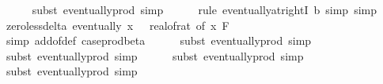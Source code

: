 \begin{isabellebody}
\ \ \ \ \isamarkupfalse%
\ {\isacharparenleft}{\kern0pt}subst\ eventually{\isacharunderscore}{\kern0pt}prod{}{\isacharprime}{\kern0pt}{\isacharcomma}{\kern0pt}\ simp{\isacharparenright}{\kern0pt}\isanewline
\ \ \ \ \isamarkupfalse%
\ {\isacharparenleft}{\kern0pt}rule\ eventually{\isacharunderscore}{\kern0pt}at{\isacharunderscore}{\kern0pt}rightI{\isacharbrackleft}{\kern0pt}\ b{\isacharequal}{\kern0pt}{\isachardoublequoteopen}{}{\isachardoublequoteclose}{\isacharbrackright}{\kern0pt}{\isacharcomma}{\kern0pt}\ simp{\isacharcomma}{\kern0pt}\ simp{\isacharparenright}{\kern0pt}\isanewline
\isanewline
\ \ \isamarkupfalse%
\ zero{\isacharunderscore}{\kern0pt}less{\isacharunderscore}{\kern0pt}delta{\isacharcolon}{\kern0pt}\ {\isachardoublequoteopen}eventually\ {\isacharparenleft}{\kern0pt}{\isasymlambda}x{\isachardot}{\kern0pt}\ {}\ {\isacharless}{\kern0pt}\ {\isacharparenleft}{\kern0pt}real{\isacharunderscore}{\kern0pt}of{\isacharunderscore}{\kern0pt}rat\ {\isacharparenleft}{\kern0pt}{\isasymdelta}{\isacharunderscore}{\kern0pt}of\ x{\isacharparenright}{\kern0pt}{\isacharparenright}{\kern0pt}{\isacharparenright}{\kern0pt}\ {\isacharquery}{\kern0pt}F{\isachardoublequoteclose}\isanewline
\ \ \ \ \isamarkupfalse%
\ {\isacharparenleft}{\kern0pt}simp\ add{\isacharcolon}{\kern0pt}{\isasymdelta}{\isacharunderscore}{\kern0pt}of{\isacharunderscore}{\kern0pt}def\ case{\isacharunderscore}{\kern0pt}prod{\isacharunderscore}{\kern0pt}beta{\isacharprime}{\kern0pt}{\isacharparenright}{\kern0pt}\isanewline
\ \ \ \ \isamarkupfalse%
\ {\isacharparenleft}{\kern0pt}subst\ eventually{\isacharunderscore}{\kern0pt}prod{}{\isacharprime}{\kern0pt}{\isacharcomma}{\kern0pt}\ simp{\isacharparenright}{\kern0pt}\isanewline
\ \ \ \ \isamarkupfalse%
\ {\isacharparenleft}{\kern0pt}subst\ eventually{\isacharunderscore}{\kern0pt}prod{}{\isacharprime}{\kern0pt}{\isacharcomma}{\kern0pt}\ simp{\isacharparenright}{\kern0pt}\isanewline
\ \ \ \ \isamarkupfalse%
\ {\isacharparenleft}{\kern0pt}subst\ eventually{\isacharunderscore}{\kern0pt}prod{}{\isacharprime}{\kern0pt}{\isacharcomma}{\kern0pt}\ simp{\isacharparenright}{\kern0pt}\isanewline
\ \ \ \ \isamarkupfalse%
\ {\isacharparenleft}{\kern0pt}subst\ eventually{\isacharunderscore}{\kern0pt}prod{}{\isacharprime}{\kern0pt}{\isacharcomma}{\kern0pt}\ simp{\isacharparenright}{\kern0pt}\isanewline
\ \ \ \ \isamarkupfalse%

\end{isabellebody}
